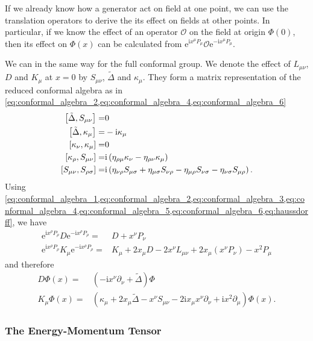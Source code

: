 \documentclass[10pt]{article}
\newcommand{\me}{\mathrm{e}}
\newcommand{\ii}{\mathrm{i}}
\begin{document}
\begin{remark}
    If we already know how a generator act on field at one point, we can use the translation operators to derive the its effect on fields at other points.
    In particular, if we know the effect of an operator $\mathcal{O}$ on the field at origin $\Phi(0)$, then its effect on $\Phi(x)$ can be calculated from $\me^{\ii x^\mu P_\mu}\mathcal{O}\me^{-\ii x^\mu P_\mu}$.
\end{remark}
We can in the same way for the full conformal group.
We denote the effect of $L_{\mu\nu}$, $D$ and $K_\mu$ at $x=0$ by $S_{\mu\nu}$, $\tilde{\Delta}$ and $\kappa_\mu$.
They form a matrix representation of the reduced conformal algebra as in \cref{eq:conformal_algebra_2,eq:conformal_algebra_4,eq:conformal_algebra_6}
\begin{align}
    \comm{\tilde{\Delta}}{S_{\mu\nu}}=&0\\
    \comm{\tilde{\Delta}}{\kappa_\mu}=&-\ii\kappa_\mu\\
    \comm{\kappa_\nu}{\kappa_\mu}=&0\\
    \comm{\kappa_\rho}{S_{\mu\nu}}=&\ii\left(\eta_{\rho\mu}\kappa_{\nu}-\eta_{\rho\nu}\kappa_\mu\right)\\
    \comm{S_{\mu\nu}}{S_{\rho\sigma}}=&\ii\left(\eta_{\nu\rho}S_{\mu\sigma}+\eta_{\mu\sigma}S_{\nu\rho}-\eta_{\mu\rho}S_{\nu\sigma}-\eta_{\nu\sigma}S_{\mu\rho}\right).
\end{align}
Using \cref{eq:conformal_algebra_1,eq:conformal_algebra_2,eq:conformal_algebra_3,eq:conformal_algebra_4,eq:conformal_algebra_5,eq:conformal_algebra_6,eq:haussdorff}, we have 
\begin{align}
    \me^{\ii x^\rho P_\rho}D\me^{-\ii x^\rho P_\rho}=&D+x^\nu P_\nu\\
    \me^{\ii x^\rho P_\rho}K_\mu\me^{-\ii x^\rho P_\rho}=&K_\mu+2x_\mu D-2x^\nu L_{\mu\nu}+2x_\mu\left(x^\nu P_\nu\right)-x^2 P_\mu
\end{align}
and therefore
\begin{align}
    D\Phi(x)=&\left(-\ii x^\nu\partial_\nu+\tilde{\Delta}\right)\Phi\\
    K_\mu\Phi(x)=&\left(\kappa_\mu+2x_\mu\tilde{\Delta}-x^\nu S_{\mu\nu}-2\ii x_\mu x^\nu\partial_\nu+\ii x^2 \partial_\mu\right)\Phi(x).
\end{align}

\subsubsection{The Energy-Momentum Tensor}
\end{document}

